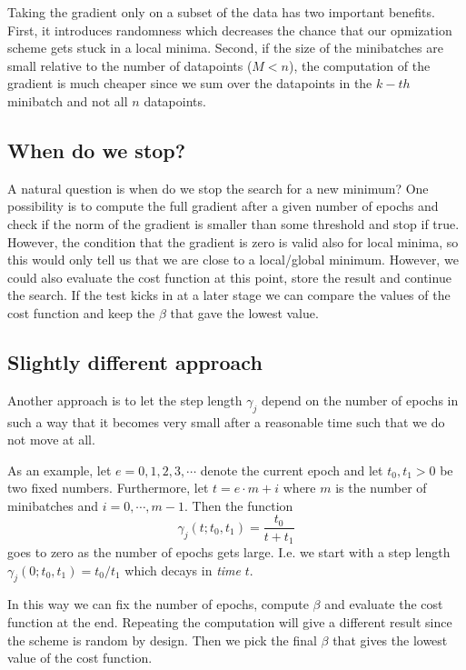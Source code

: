 \documentclass[%
oneside,                 %
final,                   %
10pt]{article}
\begin{document}
Taking the gradient only on a subset of the data has two important
benefits. First, it introduces randomness which decreases the chance
that our opmization scheme gets stuck in a local minima. Second, if
the size of the minibatches are small relative to the number of
datapoints ($M <  n$), the computation of the gradient is much
cheaper since we sum over the datapoints in the $k-th$ minibatch and not
all $n$ datapoints.

\subsection{When do we stop?}

A natural question is when do we stop the search for a new minimum?
One possibility is to compute the full gradient after a given number
of epochs and check if the norm of the gradient is smaller than some
threshold and stop if true. However, the condition that the gradient
is zero is valid also for local minima, so this would only tell us
that we are close to a local/global minimum. However, we could also
evaluate the cost function at this point, store the result and
continue the search. If the test kicks in at a later stage we can
compare the values of the cost function and keep the $\beta$ that
gave the lowest value.

\subsection{Slightly different approach}

Another approach is to let the step length $\gamma_j$ depend on the
number of epochs in such a way that it becomes very small after a
reasonable time such that we do not move at all.

As an example, let $e = 0,1,2,3,\cdots$ denote the current epoch and let $t_0, t_1 > 0$ be two fixed numbers. Furthermore, let $t = e \cdot m + i$ where $m$ is the number of minibatches and $i=0,\cdots,m-1$. Then the function $$\gamma_j(t; t_0, t_1) = \frac{t_0}{t+t_1} $$ goes to zero as the number of epochs gets large. I.e. we start with a step length $\gamma_j (0; t_0, t_1) = t_0/t_1$ which decays in \emph{time} $t$.

In this way we can fix the number of epochs, compute $\beta$ and
evaluate the cost function at the end. Repeating the computation will
give a different result since the scheme is random by design. Then we
pick the final $\beta$ that gives the lowest value of the cost
function.
\end{document}
